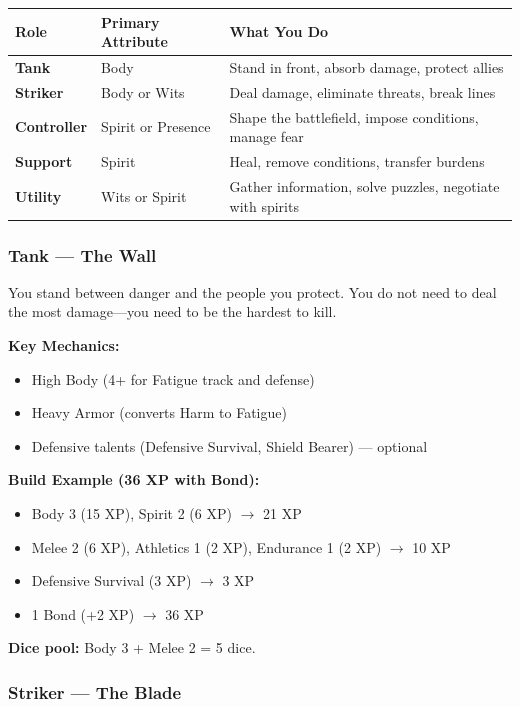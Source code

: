 \begin{center}
\begin{tabular}{p{2.2cm}|p{3cm}|p{6cm}}
\toprule
\textbf{Role} & \textbf{Primary Attribute} & \textbf{What You Do} \\
\midrule
\textbf{Tank} & Body & Stand in front, absorb damage, protect allies \\
\textbf{Striker} & Body or Wits & Deal damage, eliminate threats, break lines \\
\textbf{Controller} & Spirit or Presence & Shape the battlefield, impose conditions, manage fear \\
\textbf{Support} & Spirit & Heal, remove conditions, transfer burdens \\
\textbf{Utility} & Wits or Spirit & Gather information, solve puzzles, negotiate with spirits \\
\bottomrule
\end{tabular}
\end{center}

\subsubsection{Tank --- The Wall}

You stand between danger and the people you protect. You do not need to deal the most damage---you need to be the hardest to kill.

\textbf{Key Mechanics:}
\begin{itemize}
  \item High Body (4+ for Fatigue track and defense)
  \item Heavy Armor (converts Harm to Fatigue)
  \item Defensive talents (Defensive Survival, Shield Bearer) --- optional
\end{itemize}

\textbf{Build Example (36 XP with Bond):}
\begin{itemize}
  \item Body 3 (15 XP), Spirit 2 (6 XP) $\rightarrow$ 21 XP
  \item Melee 2 (6 XP), Athletics 1 (2 XP), Endurance 1 (2 XP) $\rightarrow$ 10 XP
  \item Defensive Survival (3 XP) $\rightarrow$ 3 XP
  \item 1 Bond (+2 XP) $\rightarrow$ 36 XP
\end{itemize}
\textbf{Dice pool:} Body 3 + Melee 2 = 5 dice.

\subsubsection{Striker --- The Blade}

